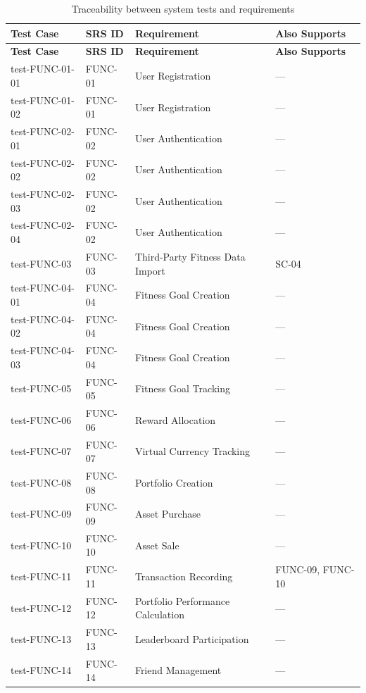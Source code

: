 \documentclass[12pt, titlepage]{article}
\begin{document}
\begin{xltabular}{\textwidth}{p{3cm}p{2.3cm}>{\raggedright\arraybackslash}X>{\raggedright\arraybackslash}p{2.4cm}}
  \caption{Traceability between system tests and requirements}\label{tab:traceability}\\
  \toprule
  \textbf{Test Case} & \textbf{SRS ID} & \textbf{Requirement} & \textbf{Also Supports}\\
  \midrule
  \endfirsthead
  \toprule
  \textbf{Test Case} & \textbf{SRS ID} & \textbf{Requirement} & \textbf{Also Supports}\\
  \midrule
  \endhead
  \bottomrule
  \endlastfoot
  test-FUNC-01-01 & FUNC-01 & User Registration & ---\\
  test-FUNC-01-02 & FUNC-01 & User Registration & ---\\
  test-FUNC-02-01 & FUNC-02 & User Authentication & ---\\
  test-FUNC-02-02 & FUNC-02 & User Authentication & ---\\
  test-FUNC-02-03 & FUNC-02 & User Authentication & ---\\
  test-FUNC-02-04 & FUNC-02 & User Authentication & ---\\
  test-FUNC-03 & FUNC-03 & Third-Party Fitness Data Import & SC-04\\
  test-FUNC-04-01 & FUNC-04 & Fitness Goal Creation & ---\\
  test-FUNC-04-02 & FUNC-04 & Fitness Goal Creation & ---\\
  test-FUNC-04-03 & FUNC-04 & Fitness Goal Creation & ---\\
  test-FUNC-05 & FUNC-05 & Fitness Goal Tracking & ---\\
  test-FUNC-06 & FUNC-06 & Reward Allocation & ---\\
  test-FUNC-07 & FUNC-07 & Virtual Currency Tracking & ---\\
  test-FUNC-08 & FUNC-08 & Portfolio Creation & ---\\
  test-FUNC-09 & FUNC-09 & Asset Purchase & ---\\
  test-FUNC-10 & FUNC-10 & Asset Sale & ---\\
  test-FUNC-11 & FUNC-11 & Transaction Recording & FUNC-09, FUNC-10\\
  test-FUNC-12 & FUNC-12 & Portfolio Performance Calculation & ---\\
  test-FUNC-13 & FUNC-13 & Leaderboard Participation & ---\\
  test-FUNC-14 & FUNC-14 & Friend Management & ---\\

\end{xltabular}
\end{document}
